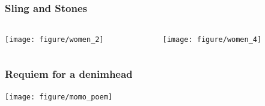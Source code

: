 \documentclass{beamer}
\begin{document}
\begin{frame}
  \frametitle{Sling and Stones}
  \begin{columns}
    \begin{column}{0.5\textwidth}
      \texttt{[image: figure/women\_2]}
    \end{column}
    \begin{column}{0.5\textwidth}
      \texttt{[image: figure/women\_4]}
    \end{column}
  \end{columns}
\end{frame}

\begin{frame}
  \frametitle{Requiem for a denimhead}

  \begin{center}
    \texttt{[image: figure/momo\_poem]}

    \tiny{}
  \end{center}
\end{frame}
\end{document}
